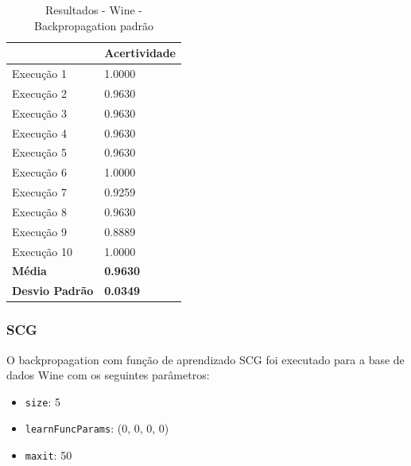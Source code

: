 \begin{table}[h!]
\centering
\caption{Resultados - Wine - Backpropagation padrão}
\label{tabela-resultado-wine-backpropagation-padrao}
\begin{tabular}{ll}
\toprule
                       & \textbf{Acertividade}       \\ \midrule
Execução 1             & 1.0000          \\
Execução 2             & 0.9630          \\
Execução 3             & 0.9630          \\
Execução 4             & 0.9630           \\
Execução 5             & 0.9630          \\
Execução 6             & 1.0000           \\
Execução 7             & 0.9259           \\
Execução 8             & 0.9630          \\
Execução 9             & 0.8889           \\
Execução 10            & 1.0000           \\ \bottomrule
\textbf{Média}         & \textbf{0.9630} \\
\textbf{Desvio Padrão} & \textbf{0.0349}
\end{tabular}
\end{table}

%

\subsubsection{SCG}

O backpropagation com função de aprendizado SCG foi executado para a base de dados Wine com os seguintes parâmetros:

\begin{itemize}
	\item \texttt{size}: 5
	\item \texttt{learnFuncParams}: (0, 0, 0, 0)
	\item \texttt{maxit}: 50
\end{itemize}

